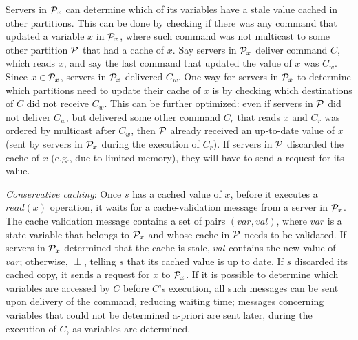 Servers in $\mathcal{P}_x$ can determine which of its variables have a stale value cached in other partitions. This can be done by checking if there was any command that updated a variable $x$ in $\mathcal{P}_x$, where such command was not multicast to some other partition $\mathcal{P}$ that had a cache of $x$. Say servers in $\mathcal{P}_x$ deliver command $C$, which reads $x$, and say the last command that updated the value of $x$ was $C_w$. Since $x \in \mathcal{P}_x$, servers in $\mathcal{P}_x$ delivered $C_w$. One way for servers in $\mathcal{P}_x$ to determine which partitions need to update their cache of $x$ is by checking which destinations of $C$ did not receive $C_w$. This can be further optimized: even if servers in $\mathcal{P}$ did not deliver $C_w$, but delivered some other command $C_r$ that reads $x$ and $C_r$ was ordered by multicast after $C_w$, then $\mathcal{P}$ already received an up-to-date value of $x$ (sent by servers in $\mathcal{P}_x$ during the execution of $C_r$). If servers in $\mathcal{P}$ discarded the cache of $x$ (e.g., due to limited memory), they will have to send a request for its value.


\emph{Conservative caching}: Once $s$ has a cached value of $x$, before it executes a $read(x)$ operation, it waits for a cache-validation message from a server in $\mathcal{P}_x$. The cache validation message contains a set of pairs $(var, val)$, where $var$ is a state variable that belongs to $\mathcal{P}_x$ and whose cache in $\mathcal{P}$ needs to be validated. 
If servers in $\mathcal{P}_x$ determined that the cache is stale, $val$ contains the new value of $var$; otherwise, $\perp$, telling $s$ that its cached value is up to date.
If $s$ discarded its cached copy, it sends a request for $x$ to $\mathcal{P}_x$.
If it is possible to determine which variables are accessed by $C$ before $C$'s execution, all such messages can be sent upon delivery of the command, reducing waiting time; messages concerning variables that could not be determined a-priori are sent later, during the execution of $C$, as variables are determined.

